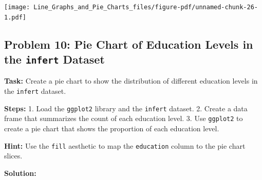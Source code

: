 \documentclass[
  letterpaper,
  DIV=11,
  numbers=noendperiod]{scrreprt}
\newenvironment{Shaded}{\begin{snugshade}}{\end{snugshade}}
\newcommand{\AttributeTok}[1]{\textcolor[rgb]{0.40,0.45,0.13}{#1}}
\newcommand{\CommentTok}[1]{\textcolor[rgb]{0.37,0.37,0.37}{#1}}
\newcommand{\DecValTok}[1]{\textcolor[rgb]{0.68,0.00,0.00}{#1}}
\newcommand{\FloatTok}[1]{\textcolor[rgb]{0.68,0.00,0.00}{#1}}
\newcommand{\FunctionTok}[1]{\textcolor[rgb]{0.28,0.35,0.67}{#1}}
\newcommand{\NormalTok}[1]{\textcolor[rgb]{0.00,0.23,0.31}{#1}}
\newcommand{\OtherTok}[1]{\textcolor[rgb]{0.00,0.23,0.31}{#1}}
\newcommand{\SpecialCharTok}[1]{\textcolor[rgb]{0.37,0.37,0.37}{#1}}
\newcommand{\StringTok}[1]{\textcolor[rgb]{0.13,0.47,0.30}{#1}}
\begin{document}
\texttt{[image: Line\_Graphs\_and\_Pie\_Charts\_files/figure-pdf/unnamed-chunk-26-1.pdf]}

\subsection*{\texorpdfstring{Problem 10: Pie Chart of Education Levels
in the \texttt{infert}
Dataset}{Problem 10: Pie Chart of Education Levels in the infert Dataset}}\label{problem-10-pie-chart-of-education-levels-in-the-infert-dataset}

\textbf{Task:} Create a pie chart to show the distribution of different
education levels in the \texttt{infert} dataset.

\textbf{Steps:} 1. Load the \texttt{ggplot2} library and the
\texttt{infert} dataset. 2. Create a data frame that summarizes the
count of each education level. 3. Use \texttt{ggplot2} to create a pie
chart that shows the proportion of each education level.

\textbf{Hint:} Use the \texttt{fill} aesthetic to map the
\texttt{education} column to the pie chart slices.

\textbf{Solution:}

\begin{Shaded}
\end{Shaded}
\end{document}
